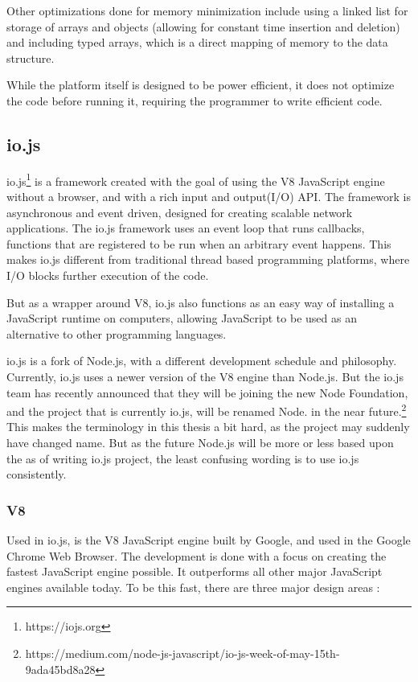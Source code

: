 Other optimizations done for memory minimization include using a linked list for storage of arrays and objects (allowing for constant time insertion and deletion) and including typed arrays, which is a direct mapping of memory to the data structure.

While the platform itself is designed to be power efficient, it does not optimize the code before running it, requiring the programmer to write efficient code.

\subsection{io.js}
io.js\footnote{https://iojs.org} is a framework created with the goal of using the V8 JavaScript engine without a browser, and with a rich input and output(I/O) API.
The framework is asynchronous and event driven, designed for creating scalable network applications.
The io.js framework uses an event loop that runs callbacks, functions that are registered to be run when an arbitrary event happens.
This makes io.js different from traditional thread based programming platforms, where I/O blocks further execution of the code.

But as a wrapper around V8, io.js also functions as an easy way of installing a JavaScript runtime on computers, allowing JavaScript to be used as an alternative to other programming languages.

io.js is a fork of Node.js, with a different development schedule and philosophy.
Currently, io.js uses a newer version of the V8 engine than Node.js.
But the io.js team has recently announced that they will be joining the new Node Foundation, and the project that is currently io.js, will be renamed Node. in the near future.\footnote{https://medium.com/node-js-javascript/io-js-week-of-may-15th-9ada45bd8a28}
This makes the terminology in this thesis a bit hard, as the project may suddenly have changed name.
But as the future Node.js will be more or less based upon the as of writing io.js project, the least confusing wording is to use io.js consistently.

\subsubsection{V8}
Used in io.js, is the V8 JavaScript engine built by Google, and used in the Google Chrome Web Browser.
The development is done with a focus on creating the fastest JavaScript engine possible.
It outperforms all other major JavaScript engines available today.
To be this fast, there are three major design areas :

